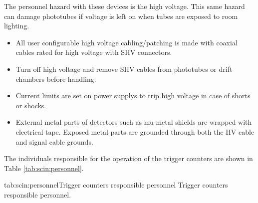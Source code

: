 \begin{safetyen}{0}{0}

The personnel hazard with these devices is the high voltage.
This same hazard can
damage phototubes if voltage is left on when tubes are exposed to room
lighting.

\begin{itemize}
  \item All user configurable high voltage cabling/patching is made with
  coaxial cables rated for high voltage with SHV connectors.
  \item Turn off high voltage and remove SHV cables from phototubes
  or drift chambers before handling.
  \item Current limits are set on power supplys to trip high voltage in case
  of shorts or shocks.
  \item External metal parts of detectors such as mu-metal shields are wrapped
  with electrical tape.  Exposed metal parts are grounded through both the HV
  cable and signal cable grounds.
\end{itemize}


The individuals responsible for the operation
of the trigger counters are shown in Table \ref{tab:scin:personnel}.

\begin{namestab}{tab:scin:personnel}{Trigger counters responsible personnel} {%
      Trigger counters responsible personnel.}
  \StephenWood{}
  \MahlonLong{}
  \JoeBeaufait{}
  \JackSegal{}
\end{namestab}
\end{safetyen}

